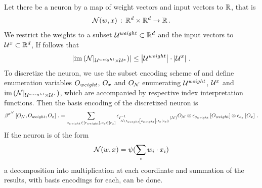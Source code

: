 \begin{example}
    Let there be a neuron by a map of weight vectors and input vectors to $\mathbb{R}$, that is
    \[ \mathcal{N}( w, x)\,:\, \mathbb{R}^{d} \times \mathbb{R}^{d} \rightarrow \mathbb{R} \, .\]
    We restrict the weights to a subset $\mathcal{U}^{weight}\subset\mathbb{R}^{d}$ and the input vectors to $\mathcal{U}^{x}\subset\mathbb{R}^{d}$,
    If follows that
    \[ \left|\mathrm{im}\left({\mathcal{N}}|_{\mathcal{U}^{weight}\times\mathcal{U}^{x}}\right)\right| \leq \left|\mathcal{U}^{weight}\right| \cdot \left|\mathcal{U}^{x}\right| \, . \]
    To discretize the neuron, we use the subset encoding scheme of  and define enumeration variables $O_{weight}$, $O_{x}$ and $O_{\mathcal{N}}$ enumerating $\mathcal{U}^{weight}$, $\mathcal{U}^{x}$ and $\mathrm{im}\left({\mathcal{N}}|_{\mathcal{U}^{weight}\times\mathcal{U}^{x}}\right)$, which are accompanied by respective index interpretation functions.
    Then the basis encoding of the discretized neuron is
    \begin{align*}
        \bsencodingofat{\lneuron}{\indvariableof{\lneuron},\indvariableof{weight},\indvariableof{x}} \, .
        = \sum_{\indindexofin{weight},\indindexofin{x}}
        \onehotmapof{\invindexinterpretationofat{\lneuron(\indexinterpretationofat{weight}{\indindexof{weight}},\indexinterpretationofat{x}{\indindexof{x}})}{\lneuron}}{\indvariableof{\lneuron}}
        \otimes \onehotmapofat{\indindexof{weight}}{\indvariableof{weight}}
        \otimes \onehotmapofat{\indindexof{x}}{\indvariableof{x}} \, .
    \end{align*}
    If the neuron is of the form
    \[ \mathcal{N}(w,x) = \psi(\sum_i w_i \cdot x_i)\]
    a decomposition into multiplication at each coordinate and summation of the results, with basis encodings for each, can be done.
\end{example}
